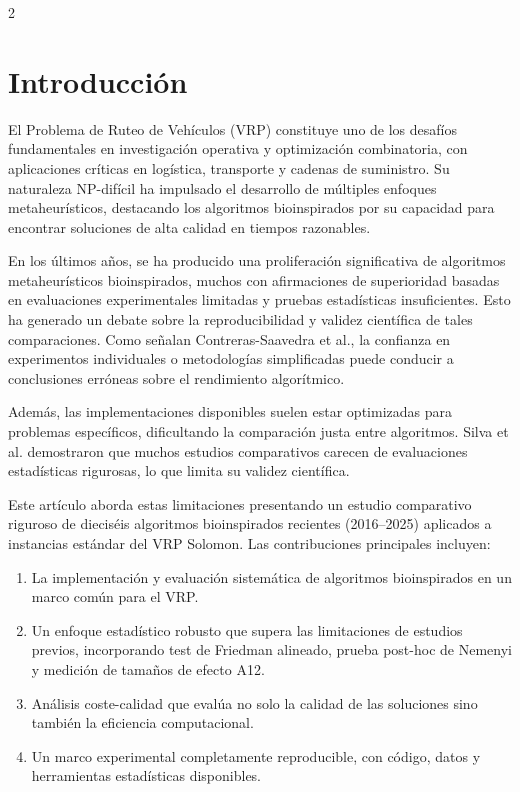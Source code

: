\documentclass[10pt,a4paper]{extarticle}
\begin{document}
\vspace{1em}
\begin{multicols}{2}


\section{Introducción}
El Problema de Ruteo de Vehículos (VRP) constituye uno de los desafíos fundamentales en investigación operativa y optimización combinatoria, con aplicaciones críticas en logística, transporte y cadenas de suministro. Su naturaleza NP-difícil ha impulsado el desarrollo de múltiples enfoques metaheurísticos, destacando los algoritmos bioinspirados por su capacidad para encontrar soluciones de alta calidad en tiempos razonables.

En los últimos años, se ha producido una proliferación significativa de algoritmos metaheurísticos bioinspirados, muchos con afirmaciones de superioridad basadas en evaluaciones experimentales limitadas y pruebas estadísticas insuficientes. Esto ha generado un debate sobre la reproducibilidad y validez científica de tales comparaciones. Como señalan Contreras-Saavedra et al., la confianza en experimentos individuales o metodologías simplificadas puede conducir a conclusiones erróneas sobre el rendimiento algorítmico.

Además, las implementaciones disponibles suelen estar optimizadas para problemas específicos, dificultando la comparación justa entre algoritmos. Silva et al. demostraron que muchos estudios comparativos carecen de evaluaciones estadísticas rigurosas, lo que limita su validez científica.

Este artículo aborda estas limitaciones presentando un estudio comparativo riguroso de dieciséis algoritmos bioinspirados recientes (2016--2025) aplicados a instancias estándar del VRP Solomon. Las contribuciones principales incluyen:

\begin{enumerate}
\item La implementación y evaluación sistemática de algoritmos bioinspirados en un marco común para el VRP.
\item Un enfoque estadístico robusto que supera las limitaciones de estudios previos, incorporando test de Friedman alineado, prueba post-hoc de Nemenyi y medición de tamaños de efecto A12.
\item Análisis coste-calidad que evalúa no solo la calidad de las soluciones sino también la eficiencia computacional.
\item Un marco experimental completamente reproducible, con código, datos y herramientas estadísticas disponibles.
\end{enumerate}


\end{multicols}
\end{document}
